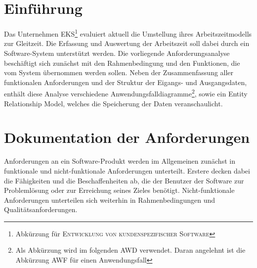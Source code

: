 \chapter{Einführung}
Das Unternehmen \textsc{EKS}\footnote{Abkürzung für \textsc{Entwicklung von kundenspezifischer Software}} evaluiert aktuell die Umstellung ihres Arbeitszeitmodells zur Gleitzeit. Die Erfassung und Auswertung der Arbeitszeit soll dabei durch ein Software-System unterstützt werden. Die vorliegende Anforderungsanalyse beschäftigt sich zunächst mit den Rahmenbedingung und den Funktionen, die vom System übernommen werden sollen. Neben der Zusammenfassung aller funktionalen Anforderungen und der Struktur der Eigangs- und Ausgangsdaten, enthält diese Analyse verschiedene Anwendungsfalldiagramme\footnote{Als Abk\"urzung wird im folgenden \textsc{AWD} verwendet. Daran angelehnt ist die Abk\"urzung \textsc{AWF} f\"ur einen Anwendungsfall}, sowie ein Entity Relationship Model, welches die Speicherung der Daten veranschaulicht.

\chapter{Dokumentation der Anforderungen}
Anforderungen an ein Software-Produkt werden im Allgemeinen zunächst in funktionale und nicht-funktionale Anforderungen unterteilt. Erstere decken dabei die Fähigkeiten und die Beschaffenheiten ab, die der Benutzer der Software zur Problemlösung oder zur Erreichung seines Zieles benötigt. Nicht-funktionale Anforderungen unterteilen sich weiterhin in Rahmenbedingungen und Qualitätsanforderungen.

